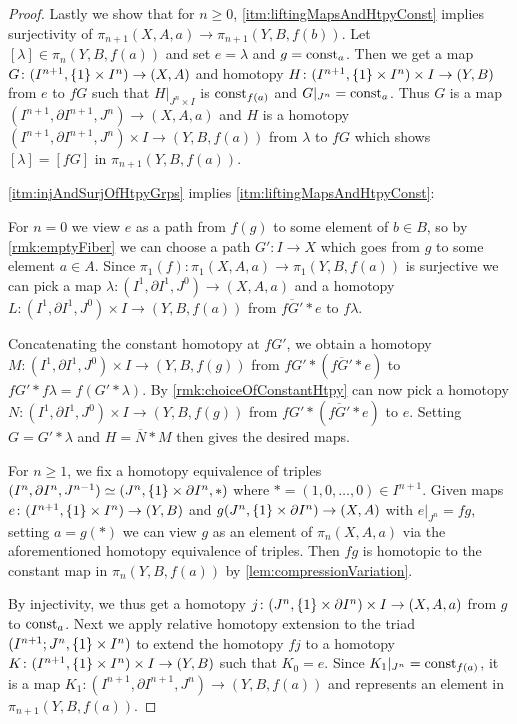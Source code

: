 \begin{prop}
\begin{proof}
        Lastly we show that for $n\geq 0$, \ref{itm:liftingMapsAndHtpyConst} implies surjectivity of $\pi_{n+1}(X,A,a)\to \pi_{n+1}(Y,B,f(b))$.
        Let $[\lambda]\in\pi_n(Y,B,f(a))$ and set $e=\lambda$ and $g=\operatorname{const}_a$. 
        Then we get a map $G\colon(I^{n+1},\left\lbrace1\right\rbrace\times I^n)\to(X,A)$ and homotopy $H\colon(I^{n+1},\left\lbrace1\right\rbrace\times I^n)\times I\to(Y,B)$ from $e$ to $fG$ such that $H|_{J^n\times I}$ is $\operatorname{const}_{f(a)}$ and $G|_{J^n}=\operatorname{const}_a$.
        Thus $G$ is a map $(I^{n+1},\partial I^{n+1},J^n)\to (X,A,a)$ and $H$ is a homotopy $(I^{n+1},\partial I^{n+1},J^n)\times I\to(Y,B,f(a))$ from $\lambda$ to $fG$ which shows $[\lambda]=[fG]$ in $\pi_{n+1}(Y,B,f(a))$.

        \ref{itm:injAndSurjOfHtpyGrps} implies \ref{itm:liftingMapsAndHtpyConst}:

        For $n=0$ we view $e$ as a path from $f(g)$ to some element of $b\in B$, so by \cref{rmk:emptyFiber} we can choose a path $G'\colon I\to X$ which goes from $g$ to some element $a\in A$.
        Since $\pi_1(f)\colon\pi_1(X,A,a)\to\pi_1(Y,B,f(a))$ is surjective we can pick a map $\lambda\colon(I^1,\partial I^1,J^0)\to(X,A,a)$ and a homotopy $L\colon(I^1,\partial I^1,J^0)\times I\to(Y,B,f(a))$ from $\overline{fG'}*e$ to $f\lambda$.
        
        Concatenating the constant homotopy at $fG'$, we obtain a homotopy $M\colon(I^1,\partial I^1,J^0)\times I\to (Y,B,f(g))$ from $fG'*(\overline{fG'}*e)$ to $fG'*f\lambda=f(G'*\lambda)$.
        By \cref{rmk:choiceOfConstantHtpy} can now pick a homotopy $N\colon(I^1,\partial I^1,J^0)\times I\to(Y,B,f(g))$ from $fG'*(\overline{fG'}*e)$ to $e$. 
        Setting $G=G'*\lambda$ and $H=\overline{N}*M$ then gives the desired maps.

        For $n\geq 1$, we fix a homotopy equivalence of triples $(I^n,\partial I^n, J^{n-1})\simeq (J^n,\left\lbrace1\right\rbrace\times\partial I^n,*)$ where $*=(1,0,\ldots,0)\in I^{n+1}$.
        Given maps $e\colon(I^{n+1},\left\lbrace1\right\rbrace\times I^n)\to (Y,B)$ and $g(J^n,\left\lbrace1\right\rbrace\times\partial I^n)\to(X,A)$ with $e|_{J^n}=fg$, setting $a=g(*)$ we can view $g$ as an element of $\pi_n(X,A,a)$ via the aforementioned homotopy equivalence of triples.
        Then $fg$ is homotopic to the constant map in $\pi_n(Y,B,f(a))$ by \cref{lem:compressionVariation}.

        By injectivity, we thus get a homotopy $j\colon(J^n,\left\lbrace1\right\rbrace\times\partial I^n)\times I\to(X,A,a)$ from $g$ to $\operatorname{const}_a$.
        Next we apply relative homotopy extension to the triad $(I^{n+1};J^n,\left\lbrace1\right\rbrace\times I^n)$ to extend the homotopy $fj$ to a homotopy $K\colon(I^{n+1},\left\lbrace1\right\rbrace\times I^n)\times I\to(Y,B)$ such that $K_0=e$.
        Since $K_1|_{J^n}=\operatorname{const}_{f(a)}$, it is a map $K_1\colon(I^{n+1},\partial I^{n+1},J^n)\to(Y,B,f(a))$ and represents an element in $\pi_{n+1}(Y,B,f(a))$.
        

\end{proof}
\end{prop}

